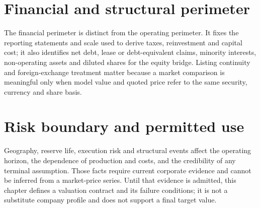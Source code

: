 \section{Financial and structural perimeter}

The financial perimeter is distinct from the operating perimeter. It fixes the
reporting statements and scale used to derive taxes, reinvestment and capital
cost; it also identifies net debt, lease or debt-equivalent claims, minority
interests, non-operating assets and diluted shares for the equity bridge.
Listing continuity and foreign-exchange treatment matter because a market
comparison is meaningful only when model value and quoted price refer to the
same security, currency and share basis.


\section{Risk boundary and permitted use}

Geography, reserve life, execution risk and structural events affect the
operating horizon, the dependence of production and costs, and the credibility
of any terminal assumption. Those facts require current corporate evidence and
cannot be inferred from a market-price series. Until that evidence is admitted,
this chapter defines a valuation contract and its failure conditions; it is not
a substitute company profile and does not support a final target value.
